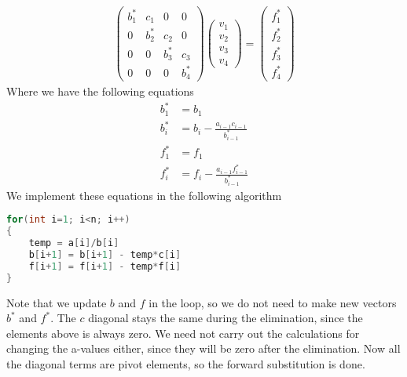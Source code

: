 \documentclass[12pt]{article}
\numberwithin{equation}{section}     %
\begin{document}
\begin{align*}
    \begin{pmatrix}
 b^{*}_1&  c_1&  0& 0\\
 0&  b^{*}_2&  c_2& 0\\
 0&  0&  b^{*}_3& c_3\\
 0&  0&  0& b^{*}_4
\end{pmatrix}
\begin{pmatrix}
v_1\\
v_2\\
v_3\\
v_4
\end{pmatrix}
=
\begin{pmatrix}
f^{*}_1\\
f^{*}_2\\
f^{*}_3\\
f^{*}_4
\end{pmatrix}
\end{align*}
Where we have the following equations
\begin{align*}
    b^{*}_{1}&=b_{1}\\
    b^{*}_{i}&=b_{i}-\frac{a_{i-1}c_{i-1}}{b_{i-1}^{*}}\\
    f^{*}_{1}&=f_{1}\\
    f^{*}_{i}&=f_{i}-\frac{a_{i-1}f_{i-1}^{*}}{b_{i-1}^{*}}
\end{align*}
We implement these equations in the following algorithm
\begin{lstlisting}[language=c++]
for(int i=1; i<n; i++)
{
    temp = a[i]/b[i]
    b[i+1] = b[i+1] - temp*c[i]
    f[i+1] = f[i+1] - temp*f[i]
}
\end{lstlisting}

Note that we update $b$ and $f$ in the loop, so we do not need to make new vectors $b^{*}$ and $f^{*}$. The $c$ diagonal stays the same during the elimination, since the elements above is always zero. We need not carry out the calculations for changing the a-values either, since they will be zero after the elimination. Now all the diagonal terms are pivot elements, so the forward substitution is done.
\end{document}
